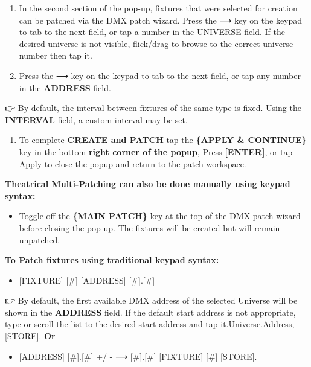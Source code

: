 \documentclass[
]{article}
\providecommand{\tightlist}{%
  \setlength{\itemsep}{0pt}\setlength{\parskip}{0pt}}
\begin{document}
\begin{enumerate}
\item
  In the second section of the pop-up, fixtures that were selected for creation can be patched via the DMX patch wizard. Press the ⟶ key on the keypad to tab to the next field, or tap a number in the UNIVERSE field. If the desired universe is not visible, flick/drag to browse to the correct universe number then tap it.
\item
  Press the ⟶ key on the keypad to tab to the next field, or tap any number in the \textbf{ADDRESS} field.
\end{enumerate}

👉 By default, the interval between fixtures of the same type is fixed.
Using the \textbf{INTERVAL} field, a custom interval may be set.

\begin{enumerate}
\def\labelenumi{\arabic{enumi}.}
\setcounter{enumi}{10}
\tightlist
\item
  To complete \textbf{CREATE and PATCH} tap the \textbf{\{APPLY \& CONTINUE\}} key in the bottom \textbf{right corner of the popup}, Press \textbf{{[}ENTER{]}}, or tap Apply to close the popup and return to the patch workspace.
\end{enumerate}

\textbf{Theatrical Multi-Patching can also be done manually using keypad syntax:}

\begin{itemize}
\tightlist
\item
  Toggle off the \textbf{\{MAIN PATCH\}} key at the top of the DMX patch wizard before closing the pop-up. The fixtures will be created but will remain unpatched.
\end{itemize}

\textbf{To Patch fixtures using traditional keypad syntax:}

\begin{itemize}
\tightlist
\item
  {[}FIXTURE{]} {[}\#{]} {[}ADDRESS{]} {[}\#{]}.{[}\#{]}
\end{itemize}

👉 By default, the first available DMX address of the selected Universe will be shown in the \textbf{ADDRESS} field. If the default start address is not appropriate, type or scroll the list to the desired start address and tap it.Universe.Address, {[}STORE{]}. \textbf{Or}

\begin{itemize}
\tightlist
\item
  {[}ADDRESS{]} {[}\#{]}.{[}\#{]} +/ - ⟶ {[}\#{]}.{[}\#{]} {[}FIXTURE{]} {[}\#{]} {[}STORE{]}.
\end{itemize}
\end{document}
